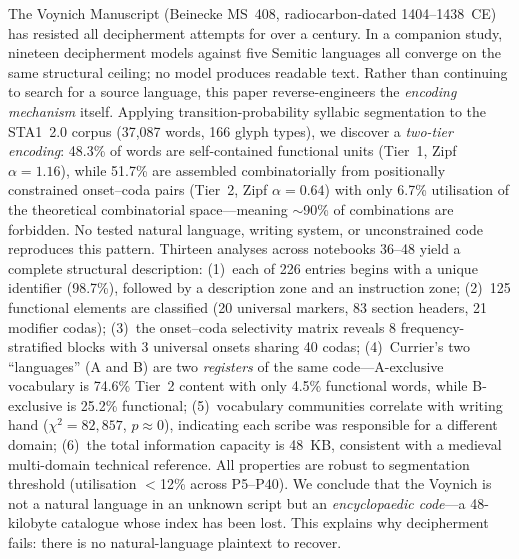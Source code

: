 
The Voynich Manuscript (Beinecke MS~408, radiocarbon-dated 1404--1438~CE) has resisted all decipherment attempts for over a century.  In a companion study, nineteen decipherment models against five Semitic languages all converge on the same structural ceiling; no model produces readable text.  Rather than continuing to search for a source language, this paper reverse-engineers the \emph{encoding mechanism} itself.  Applying transition-probability syllabic segmentation to the STA1~2.0 corpus (37,087 words, 166 glyph types), we discover a \emph{two-tier encoding}: 48.3\% of words are self-contained functional units (Tier~1, Zipf $\alpha = 1.16$), while 51.7\% are assembled combinatorially from positionally constrained onset--coda pairs (Tier~2, Zipf $\alpha = 0.64$) with only 6.7\% utilisation of the theoretical combinatorial space---meaning $\sim$90\% of combinations are forbidden.  No tested natural language, writing system, or unconstrained code reproduces this pattern.  Thirteen analyses across notebooks 36--48 yield a complete structural description: (1)~each of 226 entries begins with a unique identifier (98.7\%), followed by a description zone and an instruction zone; (2)~125 functional elements are classified (20 universal markers, 83 section headers, 21 modifier codas); (3)~the onset--coda selectivity matrix reveals 8 frequency-stratified blocks with 3 universal onsets sharing 40 codas; (4)~Currier's two ``languages'' (A and B) are two \emph{registers} of the same code---A-exclusive vocabulary is 74.6\% Tier~2 content with only 4.5\% functional words, while B-exclusive is 25.2\% functional; (5)~vocabulary communities correlate with writing hand ($\chi^2 = 82{,}857$, $p \approx 0$), indicating each scribe was responsible for a different domain; (6)~the total information capacity is 48~KB, consistent with a medieval multi-domain technical reference.  All properties are robust to segmentation threshold (utilisation $<$12\% across P5--P40).  We conclude that the Voynich is not a natural language in an unknown script but an \emph{encyclopaedic code}---a 48-kilobyte catalogue whose index has been lost.  This explains why decipherment fails: there is no natural-language plaintext to recover.
